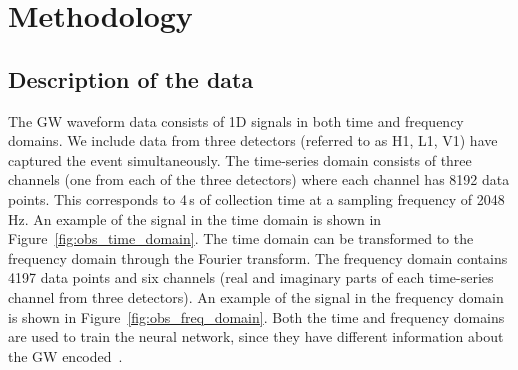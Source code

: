 \section{Methodology}
\label{sec:methodology}

\subsection{Description of the data}

The GW waveform data consists of 1D signals in both time and frequency domains. We include data from three detectors (referred to as H1, L1, V1) have captured the event simultaneously. The time-series domain consists of three channels (one from each of the three detectors) where each channel has 8192 data points. This corresponds to 4\,s of collection time at a sampling frequency of 2048\,Hz. An example of the signal in the time domain is shown in Figure~\ref{fig:obs_time_domain}. The time domain can be transformed to the frequency domain through the Fourier transform. The frequency domain contains 4197 data points and six channels (real and imaginary parts of each time-series channel from three detectors). An example of the signal in the frequency domain is shown in Figure~\ref{fig:obs_freq_domain}. Both the time and frequency domains are used to train the neural network, since they have different information about the GW encoded~\cite{bhardwaj2023peregrine}. 

